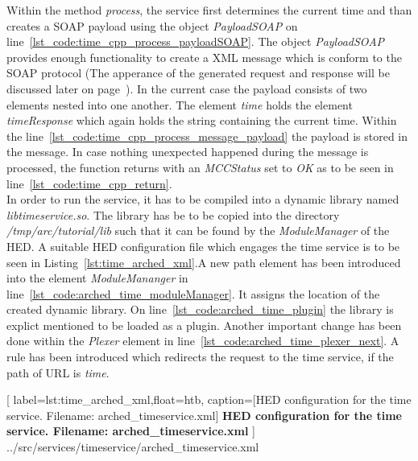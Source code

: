 Within the method \textit{process}, the service first determines the current time and than creates a SOAP payload using the object \textit{PayloadSOAP} on line~\ref{lst_code:time_cpp_process_payloadSOAP}. 
The object \textit{PayloadSOAP} provides enough functionality to create a XML message which is conform to the SOAP protocol 
(The apperance of the generated request and response will be discussed later on page~\pageref{lst:time_client_request}). 
%
%
In the current case the payload consists of two elements nested into one another. The element \textit{time} holds the element \textit{timeResponse} which again holds the string containing the current time.
Within the line~\ref{lst_code:time_cpp_process_message_payload} the payload is stored in the message. 
In case nothing unexpected happened during the message is processed, the function returns with an \textit{MCCStatus} set to \textit{OK} as to be seen in line~\ref{lst_code:time_cpp_return}.\\



In order to run the service, it has to be compiled into a dynamic library named \textit{libtimeservice.so}.
The library has be to be copied into the directory \textit{/tmp/arc/tutorial/lib} such that it can be found by the \textit{ModuleManager} of the HED.
A suitable HED configuration file which engages the time service is to be seen in Listing~\ref{lst:time_arched_xml}.A new path element has been introduced into the element \textit{ModuleMananger} in line~\ref{lst_code:arched_time_moduleManager}. It assigns the location of the created dynamic library.
On line~\ref{lst_code:arched_time_plugin} the library is explict mentioned to be loaded as a plugin.
Another important change has been done within the \textit{Plexer} element in line~\ref{lst_code:arched_time_plexer_next}. A rule has been introduced which redirects the request to the time service, if the path of URL is \textit{time}.\\ 

	[
	label=lst:time_arched_xml,float=htb,
	caption={[HED configuration for the time service. Filename: arched\_timeservice.xml]
	\textbf{HED configuration for the time service. Filename: arched\_timeservice.xml}}
	]
{../src/services/timeservice/arched_timeservice.xml}




